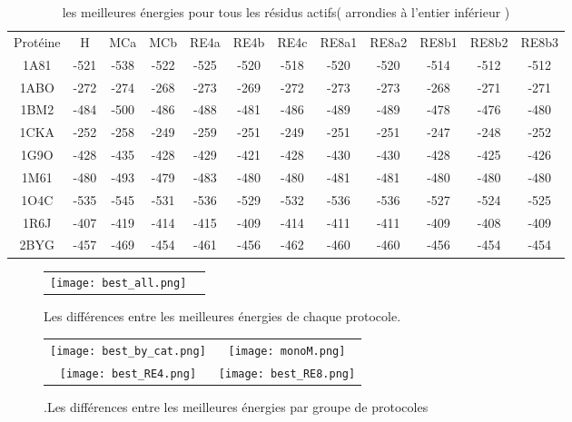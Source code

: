    \begin{table}[h]
      \centering

      \begin{tabular}{cccccccccccc}


        \toprule
        Protéine & H & MCa & MCb & RE4a & RE4b & RE4c & RE8a1 & RE8a2 & RE8b1 & RE8b2 & RE8b3 \\
        \cmidrule{1-12}
        1A81 & -521 & -538 & -522 & -525 & -520 & -518 & -520 & -520 & -514 & -512 & -512 \\
        1ABO & -272 & -274 & -268 & -273 & -269 & -272 & -273 & -273 & -268 & -271 & -271 \\
        1BM2 & -484 & -500 & -486 & -488 & -481 & -486 & -489 & -489 & -478 & -476 & -480 \\
        1CKA & -252 & -258 & -249 & -259 & -251 & -249 & -251 & -251 & -247 & -248 & -252 \\
        1G9O & -428 & -435 & -428 & -429 & -421 & -428 & -430 & -430 & -428 & -425 & -426 \\
        1M61 & -480 & -493 & -479 & -483 & -480 & -480 & -481 & -481 & -480 & -480 & -480 \\
        1O4C & -535 & -545 & -531 & -536 & -529 & -532 & -536 & -536 & -527 & -524 & -525 \\
        1R6J & -407 & -419 & -414 & -415 & -409 & -414 & -411 & -411 & -409 & -408 & -409 \\
        2BYG & -457 & -469 & -454 & -461 & -456 & -462 & -460 & -460 & -456 & -454 & -454 \\
        
        \bottomrule
      \end{tabular}      
      \caption{les meilleures énergies pour tous les résidus actifs( arrondies à l'entier inférieur )}
\label{tab:best_ener_all_all}      
    \end{table}


   \begin{figure}[t]
     \centering
     \begin{tabular}{cc}
       \texttt{[image: best\_all.png]} \\
     \end{tabular}
     \caption{Les différences entre les meilleures énergies de chaque protocole.}
\label{graph:best_ener_all_all}
   \end{figure}


    \clearpage


   \begin{figure}[t]
     \centering
     \begin{tabular}{cc}
       \texttt{[image: best\_by\_cat.png]} &
       \texttt{[image: monoM.png]} \\
       \texttt{[image: best\_RE4.png]} &
       \texttt{[image: best\_RE8.png]} \\
     \end{tabular}
     \caption{.Les différences entre les meilleures énergies par groupe de protocoles}
\label{graph:best_ener_by_algo}
   \end{figure}



